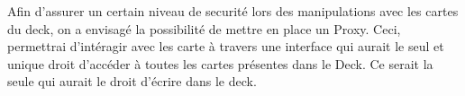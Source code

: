 Afin d'assurer un certain niveau de securité lors des manipulations avec les cartes du deck, on a envisagé la possibilité de mettre en place un Proxy. Ceci, permettrai d'intéragir avec les carte à travers une interface qui aurait le seul et unique droit d'accéder à toutes les cartes présentes dans le Deck. Ce serait la seule qui aurait le droit d'écrire dans le deck.
